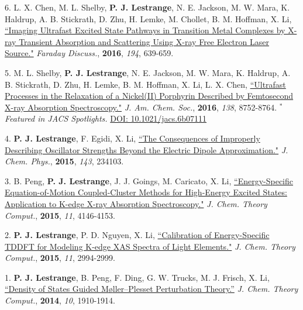 \begin{cvpublications}

\cvpublication
{6.} 
{L. X. Chen, M. L. Shelby, \textbf{P. J. Lestrange}, N. E. Jackson, M. W. Mara, K. Haldrup, A. B. Stickrath, D. Zhu, H. Lemke, M. Chollet, B. M. Hoffman, X. Li,  \href{http://pubs.rsc.org/en/Content/ArticleLanding/2016/FD/C6FD00083E}{``Imaging Ultrafast Excited State Pathways in Transition Metal Complexes by X-ray Transient Absorption and Scattering Using X-ray Free Electron Laser Source."} \textit{Faraday Discuss.}, \textbf{2016}, \textit{194}, 639-659.} 


\cvpublication
{5.} 
{M. L. Shelby, \textbf{P. J. Lestrange}, N. E. Jackson, M. W. Mara, K. Haldrup, A. B. Stickrath, D. Zhu, H. Lemke, B. M. Hoffman, X. Li, L. X. Chen, \href{http://pubs.acs.org/doi/abs/10.1021/jacs.6b02176}{``Ultrafast Processes in the Relaxation of a Nickel(II) Porphyrin Described by Femtosecond X-ray Absorption Spectroscopy."} \textit{J. Am. Chem. Soc.}, \textbf{2016}, \textit{138}, 8752-8764. $^*$\textit{Featured in JACS Spotlights.} \href{http://pubs.acs.org/doi/abs/10.1021/jacs.6b07111}{DOI: 10.1021/jacs.6b07111}} 


\cvpublication
{4.} 
{\textbf{P. J. Lestrange}, F. Egidi, X. Li, \href{http://scitation.aip.org/content/aip/journal/jcp/143/23/10.1063/1.4937410}{``The Consequences of Improperly Describing Oscillator Strengths Beyond the Electric Dipole Approximation."} \textit{J. Chem. Phys.}, \textbf{2015}, \textit{143}, 234103.} 


\cvpublication
{3.} 
{B. Peng, \textbf{P. J. Lestrange}, J. J. Goings, M. Caricato, X. Li, \href{http://pubs.acs.org/doi/full/10.1021/acs.jctc.5b00459}{``Energy-Specific Equation-of-Motion Coupled-Cluster Methods for High-Energy Excited States: Application to K-edge X-ray Absorption Spectroscopy."} \textit{J. Chem. Theory Comput.}, \textbf{2015}, \textit{11}, 4146-4153.} 


\cvpublication
{2.} 
{\textbf{P. J. Lestrange}, P. D. Nguyen, X. Li, \href{http://pubs.acs.org/doi/abs/10.1021/acs.jctc.5b00169}{``Calibration of Energy-Specific TDDFT for Modeling K-edge XAS Spectra of Light Elements."} \textit{J. Chem. Theory Comput.}, \textbf{2015}, \textit{11}, 2994-2999.} 


\cvpublication
{1.} 
{\textbf{P. J. Lestrange}, B. Peng, F. Ding, G. W. Trucks, M. J. Frisch, X. Li, \href{http://pubs.acs.org/doi/abs/10.1021/ct400765a}{``Density of States Guided M{\o}ller--Plesset Perturbation Theory.''} \textit{J. Chem. Theory Comput.}, \textbf{2014}, \textit{10}, 1910-1914.} 


\end{cvpublications}
\vspace{-1cm}

